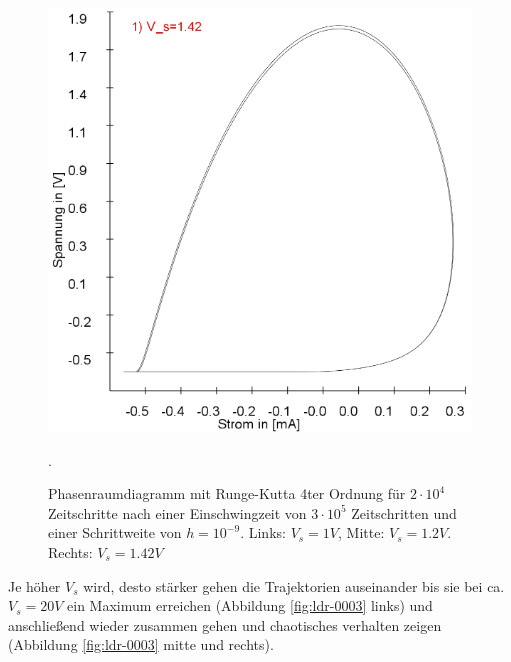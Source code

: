 \documentclass{scrartcl}
\begin{document}
\begin{figure}
\includegraphics[scale=0.28]{schwing-runge-nach300k-weitere20k-10-9-1,42V}
\caption{Phasenraumdiagramm mit Runge-Kutta 4ter Ordnung für $2\cdot10^4$ Zeitschritte nach einer Einschwingzeit von  $3\cdot10^5$ Zeitschritten und einer Schrittweite von $h=10^{-9}$. Links: $V_s=1V$, Mitte: $V_s=1.2V$. Rechts: $V_s=1.42V$}. 
\label{fig:ldr-0002}
\end{figure}
Je höher $V_s$ wird, desto stärker gehen die Trajektorien auseinander bis sie bei ca. $V_s=20V$ ein Maximum erreichen (Abbildung \ref{fig:ldr-0003} links) und anschließend wieder zusammen gehen und chaotisches verhalten zeigen (Abbildung \ref{fig:ldr-0003} mitte und rechts).
\end{document}
